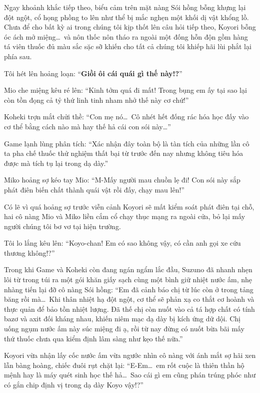 \documentclass[../main.tex]{subfiles}
\begin{document}
Ngay khoảnh khắc tiếp theo, biểu cảm trên mặt nàng Sói hồng bỗng khựng lại đột ngột, cổ họng phồng to lên như thể bị mắc nghẹn một khối dị vật khổng lồ. Chưa để cho bất kỳ ai trong chúng tôi kịp thốt lên câu hỏi tiếp theo, Koyori bỗng óc ách mở miệng\dots\ và nôn thốc nôn tháo ra ngoài một đống hỗn độn gồm hàng tá viên thuốc đủ màu sắc sặc sỡ khiến cho tất cả chúng tôi khiếp hãi lùi phắt lại phía sau.


Tôi hét lên hoảng loạn: ``\textbf{Giồi ôi cái quái gì thế này!?}''

Mio che miệng kêu ré lên: ``Kinh tởm quá đi mất! Trong bụng em ấy tại sao lại còn tồn đọng cả tỷ thứ linh tinh nham nhở thế này cơ chứ!''

Koheki trợn mắt chửi thề: ``Con mẹ nó\dots\ Cô nhét hết đống rác hóa học đấy vào cơ thể bằng cách nào mà hay thế hả cái con sói này\dots''

Game lạnh lùng phân tích: ``Xác nhận đây toàn bộ là tàn tích của những lần cô ta pha chế thuốc thử nghiệm thất bại từ trước đến nay nhưng không tiêu hóa được mà tích tụ lại trong dạ dày.''

Miko hoảng sợ kéo tay Mio: ``M-Mấy người mau chuồn lẹ đi! Con sói này sắp phát điên biến chất thành quái vật rồi đấy, chạy mau lên!''

Có lẽ vì quá hoảng sợ trước viễn cảnh Koyori sẽ mất kiểm soát phát điên tại chỗ, hai cô nàng Mio và Miko liền cắm cổ chạy thục mạng ra ngoài cửa, bỏ lại mấy người chúng tôi bơ vơ tại hiện trường.

Tôi lo lắng kêu lên: ``Koyo-chan! Em có sao không vậy, có cần anh gọi xe cứu thương không!?''

Trong khi Game và Koheki còn đang ngán ngẩm lắc đầu, Suzuno đã nhanh nhẹn lôi từ trong túi ra một gói khăn giấy sạch cùng một bình giữ nhiệt nước ấm, nhẹ nhàng tiến lại đỡ cô nàng Sói hồng: ``Em đã cảnh báo chị từ lúc còn ở trong tảng băng rồi mà\dots\ Khi thân nhiệt hạ đột ngột, cơ thể sẽ phản xạ co thắt cơ hoành và thực quản để bảo tồn nhiệt lượng. Đã thế chị còn nuốt vào cả tá hợp chất có tính bazơ và axit đối kháng nhau, khiến niêm mạc dạ dày bị kích ứng dữ dội. Chị uống ngụm nước ấm này súc miệng đi ạ, rồi từ nay đừng có nuốt bừa bãi mấy thứ thuốc chưa qua kiểm định lâm sàng như kẹo thế nữa.''

Koyori vừa nhận lấy cốc nước ấm vừa ngước nhìn cô nàng với ánh mắt sợ hãi xen lẫn bàng hoàng, chiếc đuôi rụt chặt lại: ``E-Em\dots\ em rốt cuộc là thiên thần hộ mệnh hay là máy quét sinh học thế hả\dots\ Sao cái gì em cũng phán trúng phóc như có gắn chip định vị trong dạ dày Koyo vậy!?''
\end{document}
